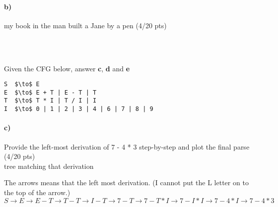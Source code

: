 \documentclass[a4paper,12pt]{article}
\begin{document}
\paragraph{b)} my book in the man built a Jane by a pen \hfill \small{(4/20 pts)} \\

\begin{tcolorbox}
\\ \\
\end{tcolorbox}
\newpage

Given the CFG below, answer \textbf{c}, \textbf{d} and \textbf{e} \\

\begin{lstlisting}[style=output,mathescape=true]
S  $\to$ E
E  $\to$ E + T | E - T | T
T  $\to$ T * I | T / I | I
I  $\to$ 0 | 1 | 2 | 3 | 4 | 6 | 7 | 8 | 9
\end{lstlisting}

\paragraph{c)} Provide the left-most derivation of 7 - 4 * 3 step-by-step and plot the final parse \hfill \small{(4/20 pts)} \\
tree matching that derivation \\

\begin{tcolorbox}
The arrows means that the left most derivation. (I cannot put the L letter on to the top of the arrow.) \\
\vspace{2cm}
$S \rightarrow E \rightarrow E-T\rightarrow T - T \rightarrow I - T \rightarrow 7 - T \rightarrow 7 - T*I \rightarrow 7-I*I  \rightarrow 7 - 4 * I  \rightarrow 7-4*3$\\\\

\end{tcolorbox}
\end{document}
